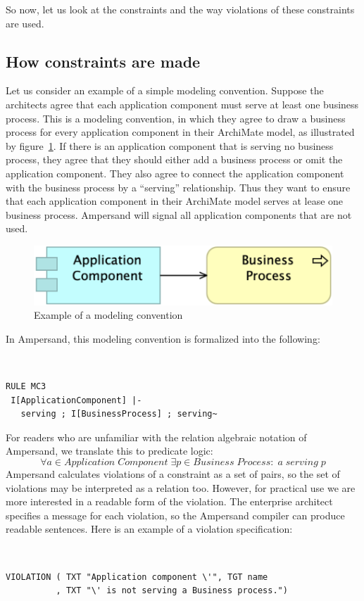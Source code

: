 \documentclass[sn-vancouver]{sn-jnl}%
\begin{document}
So now, let us look at the constraints and the way violations of these constraints are used.

\subsection{How constraints are made}\label{method}
Let us consider an example of a simple modeling convention.
Suppose the architects agree that each application component must serve at least one business process.
This is a modeling convention, in which they agree to draw a business process for every application component in their ArchiMate model,
as illustrated by figure~\ref{Policy3}.
If there is an application component that is serving no business process,
they agree that they should either add a business process or omit the application component.
They also agree to connect the application component with the business process by a ``serving'' relationship.
Thus they want to ensure that each application component in their ArchiMate model serves at lease one business process.
Ampersand will signal all application components that are not used.
\begin{figure}[b]
\centering
\includegraphics[clip=true, scale=0.4]{policy3}
\caption{\small Example of a modeling convention}
\label{Policy3}
\end{figure}

In Ampersand, this modeling convention is formalized into the following:
{\tt\small
\begin{lstlisting}[frame=single, label={rulepolicy3}, caption={}]
RULE MC3
 I[ApplicationComponent] |- 
   serving ; I[BusinessProcess] ; serving~
\end{lstlisting}
}
For readers who are unfamiliar with the relation algebraic notation of Ampersand, we translate this to predicate logic:
\[\forall a \in Application\;Component \;\exists p\in Business\;Process:\; a \;serving \;p\]
Ampersand calculates violations of a constraint as a set of pairs,
so the set of violations may be interpreted as a relation too.
However, for practical use we are more interested in a readable form of the violation.
The enterprise architect specifies a message for each violation,
so the Ampersand compiler can produce readable sentences.
Here is an example of a violation specification:
{\tt\small
\begin{lstlisting}[frame=single, label={violation}, caption={}]
VIOLATION ( TXT "Application component \'", TGT name
          , TXT "\' is not serving a Business process.")
\end{lstlisting}
}
\end{document}
